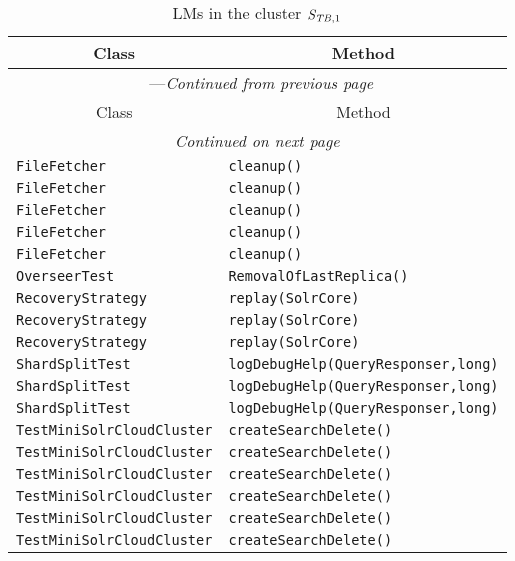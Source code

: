 \begin{center}
\begin{longtable}{ll}
\caption{LMs in the cluster $\mathit{S}_{\mathit{TB},1}$}\\
\toprule\multicolumn{1}{c}{Class}&\multicolumn{1}{c}{Method}\\\midrule
\endfirsthead

\multicolumn{2}{c}{\tablename\ \thetable{}---\textit{Continued from previous page}} \\\midrule
\multicolumn{1}{c}{Class}&\multicolumn{1}{c}{Method}\\\midrule
\endhead
\multicolumn{2}{c}{\textit{Continued on next page}}\\\midrule
\endfoot
\bottomrule
\endlastfoot

\lstinline/FileFetcher/&{\lstinline/cleanup()/}\\
\lstinline/FileFetcher/&{\lstinline/cleanup()/}\\
\lstinline/FileFetcher/&{\lstinline/cleanup()/}\\
\lstinline/FileFetcher/&{\lstinline/cleanup()/}\\
\lstinline/FileFetcher/&{\lstinline/cleanup()/}\\
\lstinline/OverseerTest/&{\lstinline/RemovalOfLastReplica()/}\\
\lstinline/RecoveryStrategy/&{\lstinline/replay(SolrCore)/}\\
\lstinline/RecoveryStrategy/&{\lstinline/replay(SolrCore)/}\\
\lstinline/RecoveryStrategy/&{\lstinline/replay(SolrCore)/}\\
\lstinline/ShardSplitTest/&{\lstinline/logDebugHelp(QueryResponser,long)/}\\
\lstinline/ShardSplitTest/&{\lstinline/logDebugHelp(QueryResponser,long)/}\\
\lstinline/ShardSplitTest/&{\lstinline/logDebugHelp(QueryResponser,long)/}\\
\lstinline/TestMiniSolrCloudCluster/&{\lstinline/createSearchDelete()/}\\
\lstinline/TestMiniSolrCloudCluster/&{\lstinline/createSearchDelete()/}\\
\lstinline/TestMiniSolrCloudCluster/&{\lstinline/createSearchDelete()/}\\
\lstinline/TestMiniSolrCloudCluster/&{\lstinline/createSearchDelete()/}\\
\lstinline/TestMiniSolrCloudCluster/&{\lstinline/createSearchDelete()/}\\
\lstinline/TestMiniSolrCloudCluster/&{\lstinline/createSearchDelete()/}\\

\end{longtable}
\end{center}
